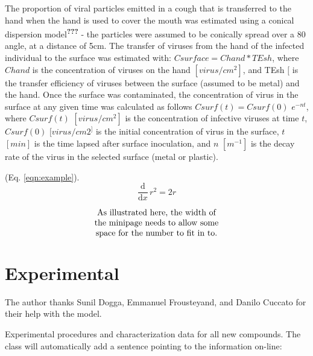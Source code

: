 \documentclass[journal=jacsat,manuscript=article]{achemso}
\begin{document}
The proportion of viral particles emitted in a cough that is transferred
to the hand when the hand is used to cover the mouth was estimated using
a conical dispersion model\textsuperscript{{\textbf{???}}} - the
particles were assumed to be conically spread over a 80 angle, at a
distance of 5cm. The transfer of viruses from the hand of the infected
individual to the surface was estimated with: \(Csurface=Chand*TEsh\),
where \(Chand\) is the concentration of viruses on the hand
\([virus/cm^2]\), and TEsh \([%
\) is the transfer efficiency of viruses between the surface (assumed to
be metal) and the hand. Once the surface was contaminated, the
concentration of virus in the surface at any given time was calculated
as follows \(Csurf(t)= Csurf(0)\) \(e^{-nt}\), where \(Csurf(t)\)
\([virus/cm^2]\) is the concentration of infective viruses at time
\(t\), \(Csurf(0)\) \([virus/cm2^]\) is the initial concentration of
virus in the surface, \(t\) \([min]\) is the time lapsed after surface
inoculation, and \(n\) \([m^{-1}]\) is the decay rate of the virus in
the selected surface (metal or plastic).

(Eq. \ref{eqn:example}). \begin{equation}
  \frac{\mathrm{d}}{\mathrm{d}x} \, r^2 = 2r \label{eqn:example}
\end{equation}

\begin{equation}
  \begin{minipage}[c]{0.80\linewidth}
    \centering
    As illustrated here, the width of \\
    the minipage needs to allow some  \\
    space for the number to fit in to.
  \end{minipage}
  \label{eqn:graphic}
\end{equation}

\hypertarget{experimental}{%
\section{Experimental}\label{experimental}}

\begin{acknowledgement}

The author thanks Sunil Dogga, Emmanuel Frousteyand, and Danilo Cuccato for their help with the model. 

\end{acknowledgement}

\begin{suppinfo}


Experimental procedures and
characterization data for all new compounds. The class will
automatically add a sentence pointing to the information on-line:

\end{suppinfo}
\end{document}
